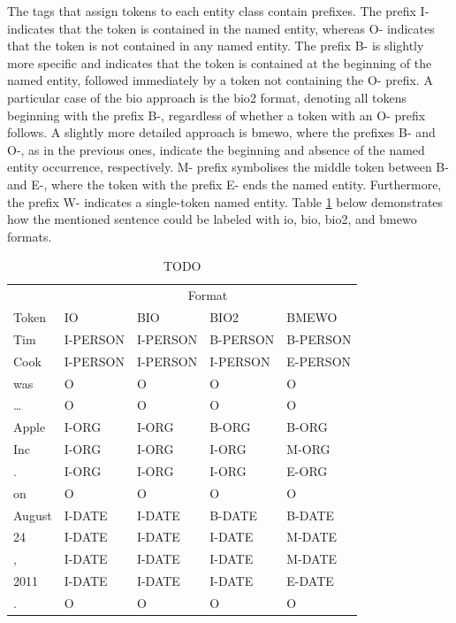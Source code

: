 The tags that assign tokens to each entity class contain prefixes. The prefix I- indicates that the token is contained in the named entity, whereas O- indicates that the token is not contained in any named entity. The prefix B- is slightly more specific and indicates that the token is contained at the beginning of the named entity, followed immediately by a token not containing the O- prefix. A particular case of the \acrshort{bio} approach is the \acrshort{bio}2 format, denoting all tokens beginning with the prefix B-, regardless of whether a token with an O- prefix follows. A slightly more detailed approach is \acrshort{bmewo}, where the prefixes B- and O-, as in the previous ones, indicate the beginning and absence of the named entity occurrence, respectively. M- prefix symbolises the middle token between B- and E-, where the token with the prefix E- ends the named entity. Furthermore, the prefix W- indicates a single-token named entity. Table \ref{table:ner-theoretical-example-tags} below demonstrates how the mentioned sentence could be labeled with \acrshort{io}, \acrshort{bio}, \acrshort{bio}2, and \acrshort{bmewo} formats.
\begin{table}[ht]
    \centering
    \caption{TODO}
    \label{table:ner-theoretical-example-tags}
    \begin{tabular}[t]{lllll}
        \hline
        &\multicolumn{4}{c}{Format}\\
        \cline{2-5}
        Token&IO&BIO&BIO2&BMEWO\\
        \hline
        Tim&I-PERSON&I-PERSON&B-PERSON&B-PERSON\\
        Cook&I-PERSON&I-PERSON&I-PERSON&E-PERSON\\
        was&O&O&O&O\\
        \dots&O&O&O&O\\
        Apple&I-ORG&I-ORG&B-ORG&B-ORG\\
        Inc&I-ORG&I-ORG&I-ORG&M-ORG\\
        .&I-ORG&I-ORG&I-ORG&E-ORG\\
        on&O&O&O&O\\
        August&I-DATE&I-DATE&B-DATE&B-DATE\\
        24&I-DATE&I-DATE&I-DATE&M-DATE\\
        ,&I-DATE&I-DATE&I-DATE&M-DATE\\
        2011&I-DATE&I-DATE&I-DATE&E-DATE\\
        .&O&O&O&O\\
        \hline
    \end{tabular}
\end{table}

